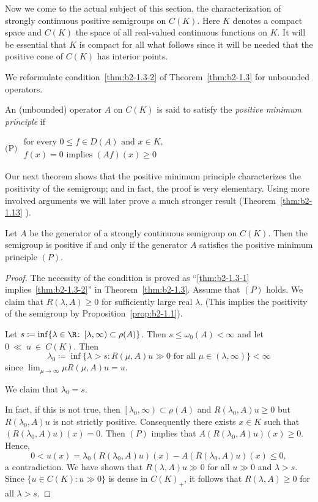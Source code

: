 Now we come to the actual subject of this section, the characterization of strongly continuous positive semigroups on $C(K)$.
Here $K$
denotes a compact space and $C(K)$ the space of all real-valued continuous functions on $K$.
It will be essential that $K$ is compact for all what follows since it will be needed that the positive cone of\/ $C(K)$ has interior points.

We reformulate condition~\ref{thm:b2-1.3-2} of Theorem~\ref{thm:b2-1.3} for unbounded operators.

\begin{definition}\label{def:b2-1.5}
An (unbounded) operator $A$ on $C(K)$ is said to satisfy the \emph{positive minimum principle} if

$\text{(P)}$ \qquad $
\begin{array}{l}
	\text{for every } 0 \leq f \in D(A) \text{ and } x \in K,\\
    f(x) = 0 \text{ implies } (Af)(x) \geq 0
\end{array}$
\end{definition}
Our next theorem shows that the positive minimum principle characterizes the positivity of the semigroup; and in fact, the proof is very elementary.
Using more involved arguments we will later prove a much stronger result (Theorem~\ref{thm:b2-1.13} ).
\begin{theorem}\label{thm:b2-1.6}
Let $A$ be the generator of a strongly continuous semigroup on $C(K)$.
Then the semigroup is positive if and only if the generator $A$ satisfies the positive minimum principle $(P)$.
\end{theorem}
\begin{proof}
The necessity of the condition is proved as 
\enquote{\ref{thm:b2-1.3-1} implies~\ref{thm:b2-1.3-2}} in Theorem~\ref{thm:b2-1.3}.
Assume that $(P)$ holds.
We claim that $R(\lambda,A) \geq 0$ for sufficiently large real $\lambda$. 
(This implies the positivity of the semigroup by Proposition~\ref{prop:b2-1.1}).

Let $s \coloneqq \inf \{\lambda \in \R \colon \left[\lambda,\infty \right) \subset \rho(A)\}$.
Then $s \leq \omega_{0}(A) < \infty$ and let $0~\ll~u~\in~C(K)$.
Then 
\[
\lambda_{0} \coloneqq \inf \{\lambda > s \colon R(\mu,A)u \gg 0 \text{ for all } \mu \in (\lambda,\infty)\} < \infty
\]
since $\lim_{\mu \to \infty} \mu R(\mu,A)u = u$.

We claim that $\lambda_{0} = s$.

In fact, if this is not true, then $\left[\lambda_{0},\infty\right) \subset \rho(A)$ and $R(\lambda_{0},A)u \geq 0$ but $R(\lambda_{0},A)u$ is not strictly positive.
Consequently there exists $x \in K$ such that $(R(\lambda_{0},A)u)(x) = 0$.
Then $(P)$ implies that $A(R(\lambda_{0},A)u)(x) \geq 0$.
Hence, 
\[
0 < u(x) = \lambda_{0}(R(\lambda_{0},A)u)(x) - A(R(\lambda_{0},A)u)(x) \leq 0,
\]
a contradiction.
We have shown that $R(\lambda,A)u \gg 0$ for all $u \gg 0$ and $\lambda > s$.
Since $\{u \in C(K): u \gg 0\}$ is dense in $C(K)_{+}$, it follows that $R(\lambda,A) \geq 0$ for all $\lambda > s$.
\end{proof}

